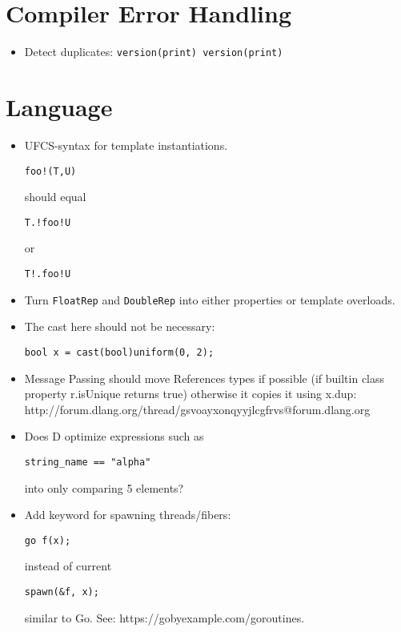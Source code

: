 \documentclass[xcolor=dvipsnames, twocolumn]{article}
\begin{document}
\section{Compiler Error Handling}
\begin{itemize}
\item Detect duplicates: \texttt{version(print) version(print)}
\end{itemize}

\section{Language}

\begin{itemize}

\item UFCS-syntax for template instantiations.
\begin{lstlisting}[frame=single]
foo!(T,U)
\end{lstlisting}

should equal

\begin{lstlisting}[frame=single]
T.!foo!U
\end{lstlisting}

or

\begin{lstlisting}[frame=single]
T!.foo!U
\end{lstlisting}

\item Turn \texttt{FloatRep} and \texttt{DoubleRep} into either properties or
  template overloads.

\item The cast here should not be necessary:
\begin{lstlisting}[frame=single]
bool x = cast(bool)uniform(0, 2);
\end{lstlisting}

\item Message Passing should move References types if possible (if builtin class
  property r.isUnique returns true) otherwise it copies it using x.dup:
  http://forum.dlang.org/thread/gsvoayxonqyyjlcgfrvs@forum.dlang.org

\item Does D optimize expressions such as
\begin{lstlisting}[frame=single]
string_name == "alpha"
\end{lstlisting}
into only comparing 5 elements?

\item Add keyword for spawning threads/fibers:
\begin{lstlisting}[frame=single]
go f(x);
\end{lstlisting}
instead of current
\begin{lstlisting}[frame=single]
spawn(&f, x);
\end{lstlisting}
similar to Go. See: https://gobyexample.com/goroutines.


\end{itemize}
\end{document}
